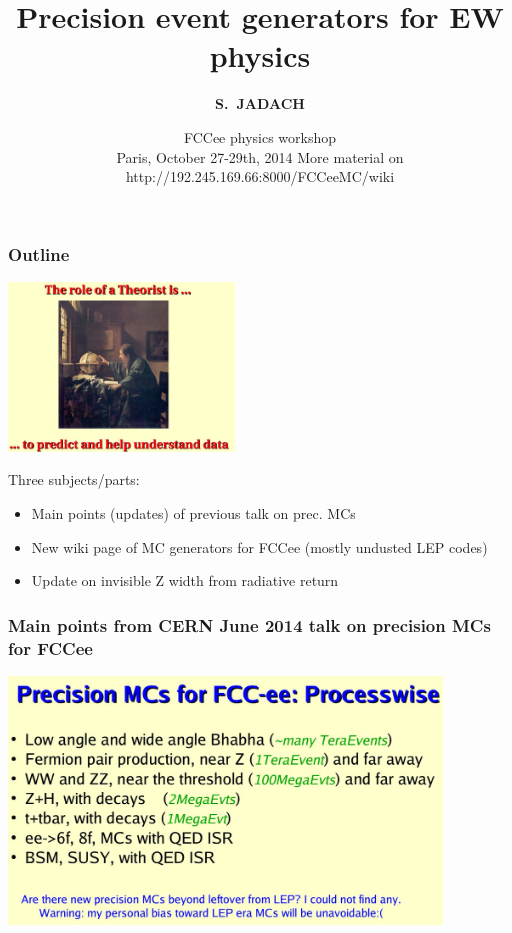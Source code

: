 \documentclass{beamer}
\title[Precision Monte Carlo generators] %
{ {\bf Precision event generators for EW physics}
} %
\author[S.~Jadach] %
{\Large\bf S.~JADACH }
\institute[Universities of Somewhere and Elsewhere] %
{ {\large\crd IFJ-PAN, Krak\'ow, Poland}\\
  {~~~}\\
  {\footnotesize
  Partly supported by Polish Government grant\\
  {\em Narodowe Centrum Nauki} DEC-2011/03/B/ST2/02632
}}
\date[Short Occasion] %
{\small FCCee physics workshop\\
   Paris, October 27-29th, 2014
\vskip 4mm
 \footnotesize
  More material on http://192.245.169.66:8000/FCCeeMC/wiki
}
\newcommand{\cbl}{\color{blue}}
\newcommand{\ns}{\normalsize}
\begin{document}
\begin{frame}
  \titlepage
\end{frame}


\begin{frame}[fragile]
\frametitle{\bf Outline}

\includegraphics[width=60mm]{./sli0.jpg}

\vspace{2mm}
\large\cbl
Three subjects/parts:
\begin{itemize}
\item\cbl
 Main points (updates) of previous talk on prec. MCs
\item
 New wiki page of MC generators for FCCee
 (mostly undusted LEP codes)
\item
 Update on invisible Z width from radiative return
\end{itemize}
\end{frame}


\begin{frame}[fragile]
\frametitle{\bf\ns 
 Main points from CERN June 2014 talk on precision MCs for FCCee}

\includegraphics[width=115mm]{./sli2.jpg}
\end{frame}
\end{document}
